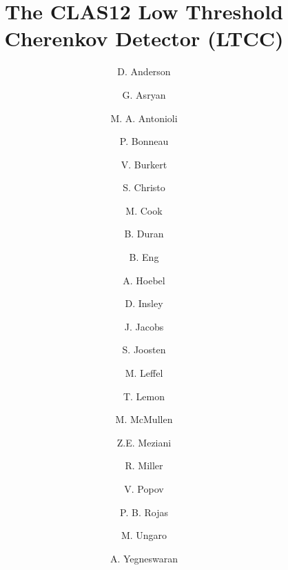 \title{The CLAS12 Low Threshold Cherenkov Detector (LTCC)}


\author[A]{D. Anderson}     %
\author[A]{G. Asryan}       %
\author[A]{M. A. Antonioli} %
\author[A]{P. Bonneau}      %
\author[A]{V. Burkert}      %
\author[A]{S. Christo}      %
\author[A]{M. Cook}         %
\author[B]{B. Duran}        %
\author[A]{B. Eng}          %
\author[A]{A. Hoebel}       %
\author[A]{D. Insley}       %
\author[A]{J. Jacobs}       %
\author[C]{S. Joosten}      %
\author[A]{M. Leffel}       %
\author[A]{T. Lemon}        %
\author[A]{M. McMullen}     %
\author[C]{Z.E. Meziani}    %
\author[A]{R. Miller}       %
\author[A]{V. Popov}        %
\author[A]{P. B. Rojas}     %
\author[A]{M. Ungaro}       %
\author[A]{A. Yegneswaran}  %


\address[A]{Thomas Jefferson National Accelerator Facility, Newport News, VA, USA}
\address[B]{Temple University, Philadelphia, PA, USA}
\address[C]{Argonne National Laboratory, Lemont, IL, USA}
